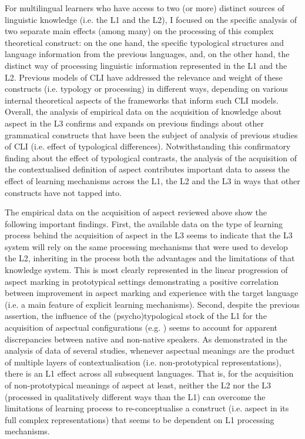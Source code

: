 \documentclass[output=paper,modfonts,nonflat,newtxmath]{langsci/langscibook}
\begin{document}
For multilingual learners who have access to two (or more) distinct sources of linguistic knowledge (i.e. the L1 and the L2), I focused on the specific analysis of two separate main effects (among many) on the processing of this complex theoretical construct: on the one hand, the specific typological structures and language information from the previous languages, and, on the other hand, the distinct way of processing linguistic information represented in the L1 and the L2. Previous models of CLI have addressed the relevance and weight of these constructs (i.e. typology or processing) in different ways, depending on various internal theoretical aspects of the frameworks that inform such CLI models. Overall, the analysis of empirical data on the acquisition of knowledge about aspect in the L3 confirms and expands on previous findings about other grammatical constructs that have been the subject of analysis of previous studies of CLI (i.e. effect of typological differences). Notwithstanding this confirmatory finding about the effect of typological contrasts, the analysis of the acquisition of the contextualised definition of aspect contributes important data to assess the effect of learning mechanisms across the L1, the L2 and the L3 in ways that other constructs have not tapped into.

The empirical data on the acquisition of aspect reviewed above show the following important findings. First, the available data on the type of learning process behind the acquisition of aspect in the L3 seems to indicate that the L3 system will rely on the same processing mechanisms that were used to develop the L2, inheriting in the process both the advantages and the limitations of that knowledge system. This is most clearly represented in the linear progression of aspect marking in prototypical settings demonstrating a positive correlation between improvement in aspect marking and experience with the target language (i.e. a main feature of explicit learning mechanisms). Second, despite the previous assertion, the influence of the (psycho)typological stock of the L1 for the acquisition of aspectual configurations (e.g. \citealt{Bylund2011, SchmiedtovaEtAl2011, AthanasopoulosEtAl2015}) seems to account for apparent discrepancies between native and non-native speakers. As demonstrated in the analysis of data of several studies, whenever aspectual meanings are the product of multiple layers of contextualisation (i.e. non-prototypical representations), there is an L1 effect across all subsequent languages. That is, for the acquisition of non-prototypical meanings of aspect at least, neither the L2 nor the L3 (processed in qualitatively different ways than the L1) can overcome the limitations of learning process to re-conceptualise a construct (i.e. aspect in its full complex representations) that seems to be dependent on L1 processing mechanisms.
\end{document}
